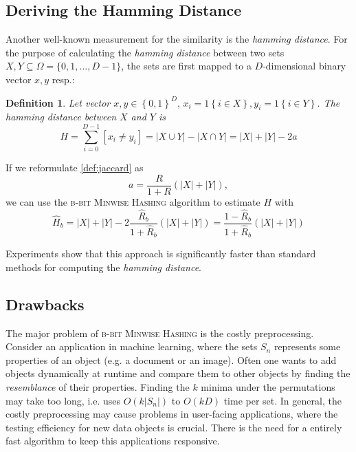 \documentclass[a4paper]{article}
\newtheorem{mydef}{Definition}
\begin{document}
\subsection{Deriving the Hamming Distance} \label{sec:hammingDistance}

Another well-known measurement for the similarity is the \emph{hamming distance}. For the purpose of calculating the \emph{hamming distance} between two sets $X,Y \subseteq \Omega = \{0,1,\ldots,D-1\}$, the sets are first mapped to a $D$-dimensional binary vector $x,y$ resp.:
\begin{framed}
\begin{mydef}\label{def:hamming}
Let vector $x,y \in \left\lbrace 0,1 \right\rbrace ^D, \, x_i = 1\left\lbrace i \in X \right\rbrace, y_i = 1\left\lbrace i \in Y \right\rbrace$. The \emph{hamming distance} between $X$ and $Y$ is
\begin{equation}
H=\sum_{i=0}^{D-1}\left[ x_i \neq y_i \right]=|X \cup Y|-|X\cap Y|=|X|+|Y|-2a
\end{equation}
\end{mydef}
\end{framed}

If we reformulate \vref{def:jaccard} as
\begin{equation}
a=\frac{R}{1+R}(|X|+|Y|),
\end{equation}
we can use the \textsc{b-bit Minwise Hashing} algorithm to estimate $H$ with
\begin{equation}
\hat{H}_b=|X|+|Y|-2\frac{\hat{R}_b}{1+\hat{R}_b}(|X|+|Y|)=\frac{1-\hat{R}_b}{1+\hat{R}_b}(|X|+|Y|)
\end{equation}

Experiments show that this approach is significantly faster than standard methods for computing the \emph{hamming distance}.

\subsection{Drawbacks} \label{sec:b-bitDrawbacks}

The major problem of \textsc{b-bit Minwise Hashing} is the costly preprocessing. Consider an application in machine learning, where the sets $S_n$ represents some properties of an object (e.g. a document or an image). Often one wants to add objects dynamically at runtime and compare them to other objects by finding the \emph{resemblance} of their properties. Finding the $k$ minima under the permutations may take too long, i.e. uses $O(k|S_n|)$ to $O(kD)$ time per set.
In general, the costly preprocessing may cause problems in user-facing applications, where the testing efficiency for new data objects is crucial. There is the need for a entirely fast algorithm to keep this applications responsive.
\end{document}
